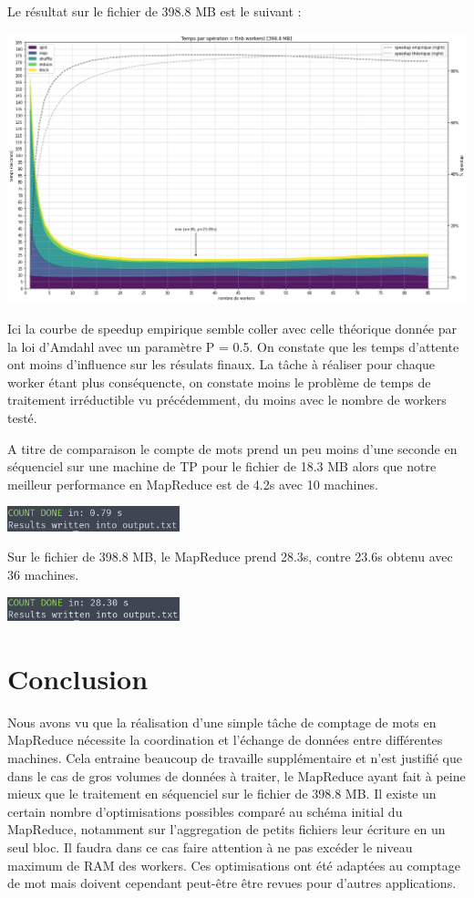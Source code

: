 \documentclass[11pt,a4paper]{article}
\begin{document}
Le résultat sur le fichier de 398.8 MB est le suivant :

\includegraphics[width=\columnwidth]{graph2.png}

Ici la courbe de speedup empirique semble coller avec celle théorique donnée par la loi d'Amdahl avec un paramètre P = 0.5. On constate que les temps d'attente ont moins d'influence sur les résulats finaux. La tâche à réaliser pour chaque worker étant plus conséquencte, on constate moins le problème de temps de traitement irréductible vu précédemment, du moins avec le nombre de workers testé.

A titre de comparaison le compte de mots prend un peu moins d'une seconde en séquenciel sur une machine de TP pour le fichier de 18.3 MB alors que notre meilleur performance en MapReduce est de 4.2s avec 10 machines.

\includegraphics[width=5cm]{screenshot_seq1.png}

Sur le fichier de 398.8 MB, le MapReduce prend 28.3s, contre 23.6s obtenu avec 36 machines.

\includegraphics[width=5cm]{screenshot_seq2.png}

\section*{Conclusion}

Nous avons vu que la réalisation d'une simple tâche de comptage de mots en MapReduce nécessite la coordination et l'échange de données entre différentes machines. Cela entraine beaucoup de travaille supplémentaire et n'est justifié que dans le cas de gros volumes de données à traiter, le MapReduce ayant fait à peine mieux que le traitement en séquenciel sur le fichier de 398.8 MB. Il existe un certain nombre d'optimisations possibles comparé au schéma initial du MapReduce, notamment sur l'aggregation de petits fichiers leur écriture en un seul bloc. Il faudra dans ce cas faire attention à ne pas excéder le niveau maximum de RAM des workers. Ces optimisations ont été adaptées au comptage de mot mais doivent cependant peut-être être revues pour d'autres applications.
\end{document}
